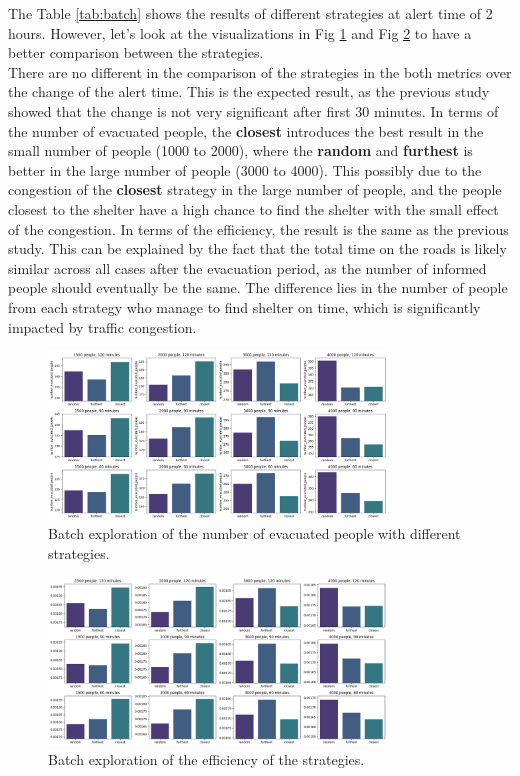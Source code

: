 \documentclass[12pt]{article}
\begin{document}
The Table \ref{tab:batch} shows the results of different strategies at alert time of 2 hours. However, let's look at the visualizations in Fig \ref{fig:batch_evacuees} and Fig \ref{fig:batch_efficiency} to have a better comparison between the strategies.\\

There are no different in the comparison of the strategies in the both metrics over the change of the alert time. This is the expected result, as the previous study showed that the change is not very significant after first 30 minutes. In terms of the number of evacuated people, the \textbf{closest} introduces the best result in the small number of people (1000 to 2000), where the \textbf{random} and \textbf{furthest} is better in the large number of people (3000 to 4000). This possibly due to the congestion of the \textbf{closest} strategy in the large number of people, and the people closest to the shelter have a high chance to find the shelter with the small effect of the congestion. In terms of the efficiency, the result is the same as the previous study. This can be explained by the fact that the total time on the roads is likely similar across all cases after the evacuation period, as the number of informed people should eventually be the same. The difference lies in the number of people from each strategy who manage to find shelter on time, which is significantly impacted by traffic congestion.

\begin{figure}
    \centering
    \includegraphics[width=0.8\textwidth]{../images/batch_evacuees.png}
    \caption{Batch exploration of the number of evacuated people with different strategies.}
    \label{fig:batch_evacuees}
\end{figure}

\begin{figure}
    \centering
    \includegraphics[width=0.8\textwidth]{../images/batch_efficiency.png}
    \caption{Batch exploration of the efficiency of the strategies.}
    \label{fig:batch_efficiency}
\end{figure}
\end{document}
